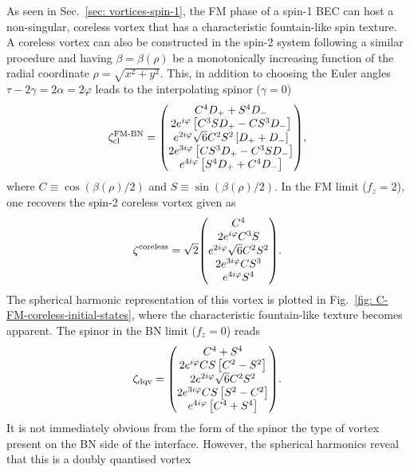 As seen in Sec.~\ref{sec: vortices-spin-1}, the FM phase of a spin-1 BEC can
host a non-singular, coreless vortex that has a characteristic fountain-like
spin texture.
A coreless vortex can also be constructed in the spin-2 system following a
similar procedure and having \(\beta=\beta(\rho)\) be a monotonically increasing
function of the radial coordinate \(\rho = \sqrt{x^2 + y^2}\).
This, in addition to choosing the Euler angles
\(\tau - 2\gamma = 2\alpha = 2\varphi \) leads to the interpolating spinor
(\(\gamma=0\))
\begin{equation}\label{eq: FM-BN-coreless-DQV}
    \zeta^\text{FM-BN}_\text{cl} = \mqty(
    C^4D_+ + S^4D_- \\
    2e^{i\varphi}\left[C^3SD_+
        - CS^3D_-\right] \\
    e^{2i\varphi}\sqrt{6}C^2S^2\left[D_+
        + D_- \right] \\
    2e^{3i\varphi}\left[CS^3D_+
        - C^3SD_-\right] \\
    e^{4i\varphi}\left[S^4D_+ + C^4D_- \right]
    ),
\end{equation}
where \(C \equiv \cos(\beta(\rho)/2)\) and \(S \equiv \sin(\beta(\rho)/2)\).
In the FM limit (\(f_z=2\)), one recovers the spin-2 coreless vortex given as
\begin{equation}\label{eq: FM-BN-coreless}
    \zeta^\mathrm{coreless} = \sqrt{2}\mqty(C^4 \\ 2e^{i\varphi}C^3S \\
    e^{2i\varphi}\sqrt{6}C^2S^2 \\ 2e^{3i\varphi}CS^3 \\ e^{4i\varphi}S^4
    ).
\end{equation}
The spherical harmonic representation of this vortex is plotted in
Fig.~\ref{fig: C-FM-coreless-initial-states}, where the characteristic
fountain-like texture becomes apparent.
The spinor in the BN limit (\(f_z=0\)) reads
\begin{equation}\label{eq: FM-BN-DQV}
    \zeta_\mathrm{dqv} = \mqty(
    C^4 + S^4 \\
    2e^{i\varphi}CS\left[C^2-S^2\right] \\
    2e^{2i\varphi}\sqrt{6}C^2S^2 \\
    2e^{3i\varphi}CS\left[S^2 - C^2\right] \\
    e^{4i\varphi}\left[C^4 + S^4\right]).
\end{equation}
It is not immediately obvious from the form of the spinor the type of vortex
present on the BN side of the interface.
However, the spherical harmonics reveal that this is a doubly quantised vortex
